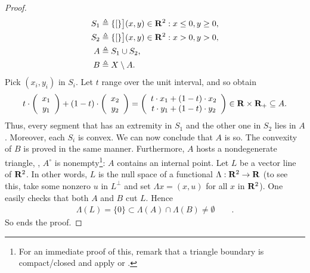 \begin{proof}
   \begin{align}
     S_1 & \triangleq \{[\}\big]{(x, y )\in \mathbf{R}^2: x\leq 0, y \geq 0}, \\
     S_2 & \triangleq \{[\}\big]{(x, y )\in \mathbf{R}^2: x>0, y > 0}, \\
     A   & \triangleq S_1\cup S_2, \\
     B   & \triangleq X\setminus A.
   \end{align}
%
Pick $(x_i, y_i)$ in $S_i$. %
Let $t$ range over the unit interval, and so obtain %
%
  \begin{align}
    t\cdot  \left(\begin{array}{c}x_1 \\y_1\end{array}\right)+
    (1-t)  \cdot \left(\begin{array}{c}x_2 \\ y_2\end{array}\right)= 
    \left(\begin{array}{c}t\cdot x_1+(1-t)\cdot x_2 \\t\cdot y_1 + (1-t)\cdot y_2\end{array}\right)
    \in \mathbf{R}\times \mathbf{R}_+\subseteq A.
  \end{align}
%
Thus, every segment that has an extremity in $S_1$ and the other one in $S_2$ %
lies in $A$. %
Moreover, each $S_i$ is convex. We can now conclude that $A$ is so. %
The convexity of $B$ is proved in the same manner. Furthermore, %
$A$ hosts a nondegenerate triangle, \ie,  $A^{\circ}$ is nonempty\footnote{%
%
  For an immediate proof of this, remark that a triangle boundary is %
  compact/closed and apply  or .
}: %
$A$ contains an internal point. %
%
\skipline
%
Let $L$ be a vector line of $\mathbf{R}^2$. %
In other words, $L$ is the null space of a functional %
%
  $\Lambda: \mathbf{R}^2\to \mathbf{R}$ %
%
(to see this, take some nonzero $u$ in $L^\bot$ and set %
%
  $\Lambda x= (x,u)$ %
%
for all $x$ in $\mathbf{R}^2$). One easily checks that both $A$ and $B$ cut $L$. %
Hence %
%
  \begin{align}
    \Lambda (L)=\{0\}\subset \Lambda (A)\cap \Lambda (B)\neq\emptyset\qquad.
    \end{align}
%
So ends the proof.
\end{proof}
